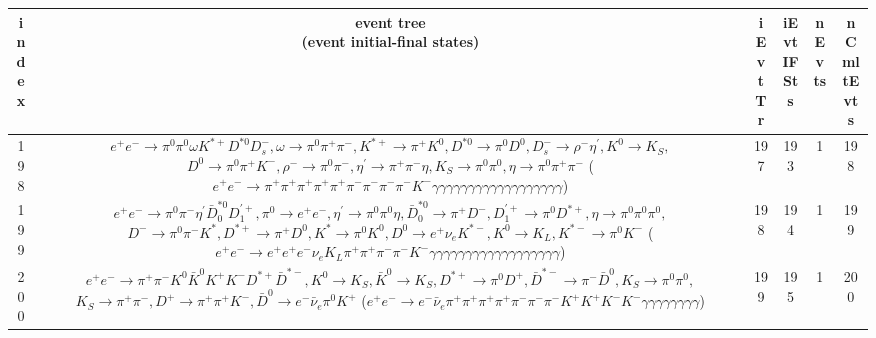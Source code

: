 \documentclass[landscape]{article}
\begin{document}
\begin{table}[htbp!]
\small
\centering
\begin{tabular}{|c|c|c|c|c|c|}
\hline
index & \thead{event tree \\ (event initial-final states)} & iEvtTr & iEvtIFSts & nEvts & nCmltEvts \\
\hline
198 & \makecell{ $ 
e^{+} e^{-} \rightarrow \pi^{0} \pi^{0} \omega K^{*+} D^{*0} D_{s}^{-} ,
\omega \rightarrow \pi^{0} \pi^{+} \pi^{-} ,
K^{*+} \rightarrow \pi^{+} K^{0} ,
D^{*0} \rightarrow \pi^{0} D^{0} ,
D_{s}^{-} \rightarrow \rho^{-} \eta^{\prime} ,
K^{0} \rightarrow K_{S} ,
$ \\ $
D^{0} \rightarrow \pi^{0} \pi^{+} K^{-} ,
\rho^{-} \rightarrow \pi^{0} \pi^{-} ,
\eta^{\prime} \rightarrow \pi^{+} \pi^{-} \eta ,
K_{S} \rightarrow \pi^{0} \pi^{0} ,
\eta \rightarrow \pi^{0} \pi^{+} \pi^{-} 
$ \\ ($
e^{+} e^{-} \rightarrow \pi^{+} \pi^{+} \pi^{+} \pi^{+} \pi^{+} \pi^{-} \pi^{-} \pi^{-} \pi^{-} K^{-} \gamma \gamma \gamma \gamma \gamma \gamma \gamma \gamma \gamma \gamma \gamma \gamma \gamma \gamma \gamma \gamma \gamma \gamma 
$) } & 197 & 193 & 1 & 198 \\
\hline
199 & \makecell{ $ 
e^{+} e^{-} \rightarrow \pi^{0} \pi^{-} \eta^{\prime} \bar{D}_{0}^{*0} D_{1}^{\prime+} ,
\pi^{0} \rightarrow e^{+} e^{-} ,
\eta^{\prime} \rightarrow \pi^{0} \pi^{0} \eta ,
\bar{D}_{0}^{*0} \rightarrow \pi^{+} D^{-} ,
D_{1}^{\prime+} \rightarrow \pi^{0} D^{*+} ,
\eta \rightarrow \pi^{0} \pi^{0} \pi^{0} ,
$ \\ $
D^{-} \rightarrow \pi^{0} \pi^{-} K^{*} ,
D^{*+} \rightarrow \pi^{+} D^{0} ,
K^{*} \rightarrow \pi^{0} K^{0} ,
D^{0} \rightarrow e^{+} \nu_{e} K^{*-} ,
K^{0} \rightarrow K_{L} ,
K^{*-} \rightarrow \pi^{0} K^{-} 
$ \\ ($
e^{+} e^{-} \rightarrow e^{+} e^{+} e^{-} \nu_{e} K_{L} \pi^{+} \pi^{+} \pi^{-} \pi^{-} K^{-} \gamma \gamma \gamma \gamma \gamma \gamma \gamma \gamma \gamma \gamma \gamma \gamma \gamma \gamma \gamma \gamma \gamma \gamma 
$) } & 198 & 194 & 1 & 199 \\
\hline
200 & \makecell{ $ 
e^{+} e^{-} \rightarrow \pi^{+} \pi^{-} K^{0} \bar{K}^{0} K^{+} K^{-} D^{*+} \bar{D}^{*-} ,
K^{0} \rightarrow K_{S} ,
\bar{K}^{0} \rightarrow K_{S} ,
D^{*+} \rightarrow \pi^{0} D^{+} ,
\bar{D}^{*-} \rightarrow \pi^{-} \bar{D}^{0} ,
K_{S} \rightarrow \pi^{0} \pi^{0} ,
$ \\ $
K_{S} \rightarrow \pi^{+} \pi^{-} ,
D^{+} \rightarrow \pi^{+} \pi^{+} K^{-} ,
\bar{D}^{0} \rightarrow e^{-} \bar{\nu}_{e} \pi^{0} K^{+} 
$ \\ ($
e^{+} e^{-} \rightarrow e^{-} \bar{\nu}_{e} \pi^{+} \pi^{+} \pi^{+} \pi^{+} \pi^{-} \pi^{-} \pi^{-} K^{+} K^{+} K^{-} K^{-} \gamma \gamma \gamma \gamma \gamma \gamma \gamma \gamma 
$) } & 199 & 195 & 1 & 200 \\
\hline
\end{tabular}
\end{table}
\end{document}
